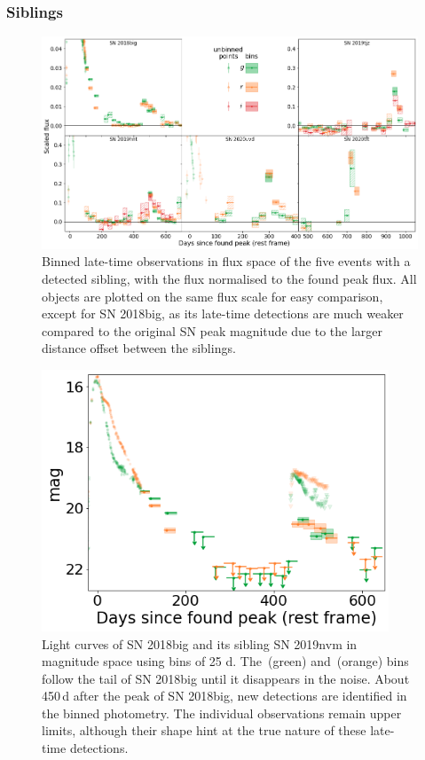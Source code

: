 \documentclass[a4paper,oneside,12pt, class=Latex/Classes/PhDthesisPSnPDF, crop=false]{standalone}
\begin{document}
\subsubsection{Siblings}
\begin{figure}
 \centering
 \includegraphics[width=\textwidth]{../Images/chapter_3/sibling_norm_plots.png}
 \caption{Binned late-time observations in flux space of the five events with a detected sibling, with the flux normalised to the found peak flux. All objects are plotted on the same flux scale for easy comparison, except for SN 2018big, as its late-time detections are much weaker compared to the original SN peak magnitude due to the larger distance offset between the siblings.}
 \label{sibling_plots}
\end{figure}

\begin{figure}
 \centering
 \includegraphics[width=0.921\textwidth]{../Images/chapter_3/ted.png}
 \caption{Light curves of SN 2018big and its sibling SN 2019nvm in magnitude space using bins of 25 d. The \ztfg\,(green) and \ztfr\,(orange) bins follow the tail of SN 2018big until it disappears in the noise. About 450\,d after the peak of SN 2018big, new detections are identified in the binned photometry. The individual observations remain upper limits, although their shape hint at the true nature of these late-time detections.}
 \label{sibling_example}
\end{figure}
\end{document}
